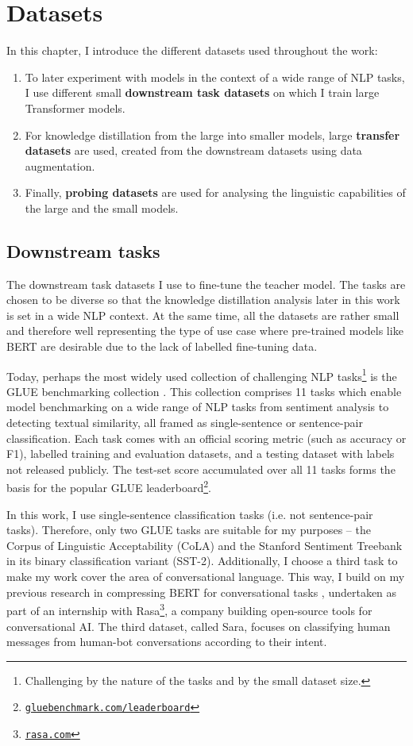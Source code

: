 \documentclass[bsc,frontabs,singlespacing,parskip,deptreport]{infthesis}
\newcommand\rurl[1]{%
  \href{https://#1}{\nolinkurl{#1}}%
}
\begin{document}
\chapter{Datasets}{
  \label{chap:datasets}

  In this chapter, I introduce the different datasets used throughout the work:
  \begin{enumerate}
    \item To later experiment with models in the context of a wide range of NLP tasks, I use different small \textbf{downstream task datasets} on which I train large Transformer models.
    \item For knowledge distillation from the large into smaller models, large \textbf{transfer datasets} are used, created from the downstream datasets using data augmentation.
    \item Finally, \textbf{probing datasets} are used for analysing the linguistic capabilities of the large and the small models.
  \end{enumerate}

  \section{Downstream tasks}{
    The downstream task datasets I use to fine-tune the teacher model. The tasks are chosen to be diverse so that the knowledge distillation analysis later in this work is set in a wide NLP context. At the same time, all the datasets are rather small and therefore well representing the type of use case where pre-trained models like BERT are desirable due to the lack of labelled fine-tuning data.

    Today, perhaps the most widely used collection of challenging NLP tasks\footnote{Challenging by the nature of the tasks and by the small dataset size.} is the GLUE benchmarking collection \citep{Wang_2018}.
    This collection comprises 11 tasks which enable model benchmarking on a wide range of NLP tasks from sentiment analysis to detecting textual similarity, all framed as single-sentence or sentence-pair classification.
    Each task comes with an official scoring metric (such as accuracy or F1), labelled training and evaluation datasets, and a testing dataset with labels not released publicly.
    The test-set score accumulated over all 11 tasks forms the basis for the popular GLUE leaderboard\footnote{\rurl{gluebenchmark.com/leaderboard}}.
    
    In this work, I use single-sentence classification tasks (i.e. not sentence-pair tasks). Therefore, only two GLUE tasks are suitable for my purposes -- the Corpus of Linguistic Acceptability (CoLA) and the Stanford Sentiment Treebank in its binary classification variant (SST-2). 
    Additionally, I choose a third task to make my work cover the area of conversational language. This way, I build on my previous research in compressing BERT for conversational tasks \citet{Sucik_2019}, undertaken as part of an internship with Rasa\footnote{\rurl{rasa.com}}, a company building open-source tools for conversational AI. The third dataset, called Sara, focuses on classifying human messages from human-bot conversations according to their intent.

}}
\end{document}
